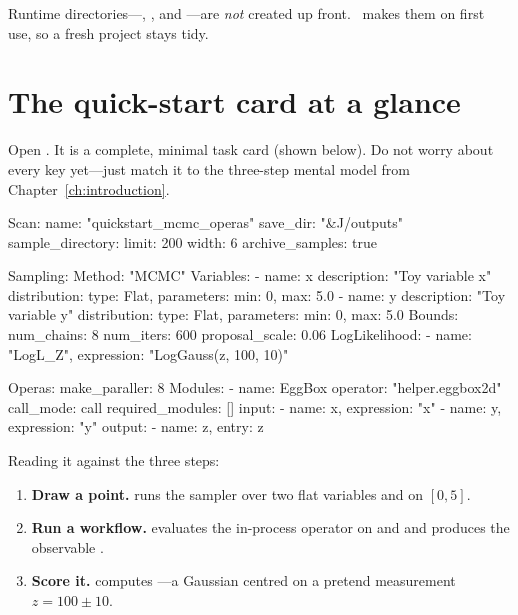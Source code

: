 \begin{jnote}
Runtime directories---, , and ---are \emph{not}
created up front. \Jarvis\ makes them on first use, so a fresh project stays tidy.
\end{jnote}

\section{The quick-start card at a glance}
\label{sec:quickstart-card}

Open . It is a complete, minimal task card
(shown below). Do not worry about every key yet---just match it to the
three-step mental model from Chapter~\ref{ch:introduction}.

\begin{yamlwin}
Scan:
  name: "quickstart_mcmc_operas"
  save_dir: "&J/outputs"
  sample_directory:
    limit: 200
    width: 6
    archive_samples: true

Sampling:
  Method: "MCMC"
  Variables:
    - name: x
      description: "Toy variable x"
      distribution: {type: Flat, parameters: {min: 0, max: 5.0}}
    - name: y
      description: "Toy variable y"
      distribution: {type: Flat, parameters: {min: 0, max: 5.0}}
  Bounds:
    num_chains: 8
    num_iters: 600
    proposal_scale: 0.06
  LogLikelihood:
    - {name: "LogL_Z", expression: "LogGauss(z, 100, 10)"}

Operas:
  make_paraller: 8
  Modules:
    - name: EggBox
      operator: "helper.eggbox2d"
      call_mode: call
      required_modules: []
      input:
        - {name: x, expression: "x"}
        - {name: y, expression: "y"}
      output:
        - {name: z, entry: z}
\end{yamlwin}

\noindent Reading it against the three steps:

\begin{enumerate}
  \item \textbf{Draw a point.}  runs the  sampler over two
        flat variables  and  on $[0, 5]$.
  \item \textbf{Run a workflow.}  evaluates the in-process operator
         on  and  and produces the observable
        .
  \item \textbf{Score it.}  computes ---a
        Gaussian centred on a pretend measurement $z = 100 \pm 10$.
\end{enumerate}

